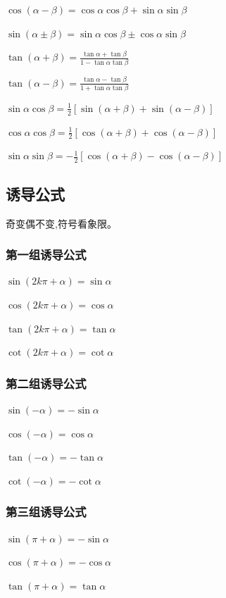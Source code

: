 \documentclass[UTF8]{ctexbook}
\begin{document}
{{{  $\cos(\alpha - \beta) = \cos{\alpha}\cos{\beta} + \sin{\alpha}\sin{\beta}$

  $\sin(\alpha \pm \beta) = \sin{\alpha}\cos{\beta} \pm \cos{\alpha}\sin{\beta}$

  $\tan(\alpha + \beta) = \frac{\tan\alpha + \tan\beta}{1 - \tan\alpha\tan\beta}$

  $\tan(\alpha - \beta) = \frac{\tan\alpha - \tan\beta}{1 + \tan\alpha\tan\beta}$

  $\sin{\alpha}\cos{\beta} = \frac{1}{2}[\sin{(\alpha + \beta)} + \sin{(\alpha - \beta)}]$

  $\cos{\alpha}\cos{\beta} = \frac{1}{2}[\cos{(\alpha + \beta)} + \cos{(\alpha - \beta)}]$

  $\sin{\alpha}\sin{\beta} = -\frac{1}{2}[\cos{(\alpha + \beta)} - \cos{(\alpha - \beta)}]$
}%

\subsection{诱导公式}{
  \indent 奇变偶不变,符号看象限。
  \subsubsection{第一组诱导公式}{
    $\sin{(2k\pi + \alpha)} = \sin{\alpha}$

    $\cos{(2k\pi + \alpha)} = \cos{\alpha}$

    $\tan(2k\pi + \alpha) = \tan\alpha$

    $\cot(2k\pi + \alpha) = \cot\alpha$
  }%

  \subsubsection{第二组诱导公式}{
    $\sin(-\alpha) = -\sin\alpha$

    $\cos(-\alpha) = \cos\alpha$

    $\tan(-\alpha) = -\tan\alpha$

    $\cot(-\alpha) = -\cot\alpha$
  }%

  \subsubsection{第三组诱导公式}{
    $\sin(\pi + \alpha) = -\sin\alpha$

    $\cos(\pi + \alpha) = -\cos\alpha$

    $\tan(\pi + \alpha) = \tan\alpha$

}}}}
\end{document}
